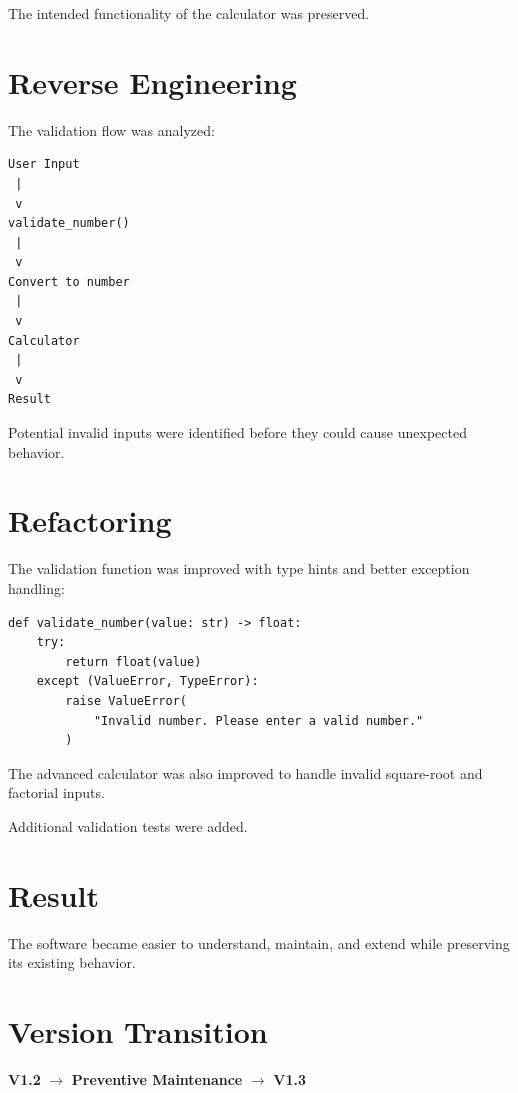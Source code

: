 \documentclass[12pt,a4paper,openany]{report}
\begin{document}
The intended functionality of the calculator was preserved.

\section{Reverse Engineering}

The validation flow was analyzed:

\begin{verbatim}
User Input
 |
 v
validate_number()
 |
 v
Convert to number
 |
 v
Calculator
 |
 v
Result
\end{verbatim}

Potential invalid inputs were identified before they could cause
unexpected behavior.

\section{Refactoring}

The validation function was improved with type hints and better
exception handling:

\begin{lstlisting}
def validate_number(value: str) -> float:
    try:
        return float(value)
    except (ValueError, TypeError):
        raise ValueError(
            "Invalid number. Please enter a valid number."
        )
\end{lstlisting}

The advanced calculator was also improved to handle invalid square-root
and factorial inputs.

Additional validation tests were added.

\section{Result}

The software became easier to understand, maintain, and extend while
preserving its existing behavior.

\section{Version Transition}

\begin{center}
\textbf{V1.2}
$\rightarrow$
\textbf{Preventive Maintenance}
$\rightarrow$
\textbf{V1.3}
\end{center}

\end{document}
